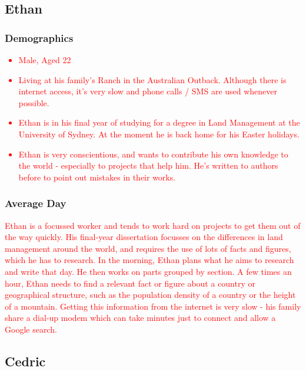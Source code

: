 \documentclass{article}
\begin{document}
\newpage
\subsection{Ethan}
\subsubsection{Demographics}
\textcolor{red}{
\begin{itemize}
  \item Male, Aged 22
  \item Living at his family's Ranch in the Australian Outback.  Although there is internet access, it's very slow and phone calls / SMS are used whenever possible.
  \item Ethan is in his final year of studying for a degree in Land Management at the University of Sydney.  At the moment he is back home for his Easter holidays.
  \item Ethan is very conscientious, and wants to contribute his own knowledge to the world - especially to projects that help him.  He's written to authors before to point out mistakes in their works.
\end{itemize}
}
\subsubsection{Average Day}
\textcolor{red}{
Ethan is a focussed worker and tends to work hard on projects to get them out of the way quickly.  His final-year dissertation focusses on the differences in land management around the world, and requires the use of lots of facts and figures, which he has to research.  In the morning, Ethan plans what he aims to research and write that day.  He then works on parts grouped by section.  A few times an hour, Ethan needs to find a relevant fact or figure about a country or geographical structure, such as the population density of a country or the height of a mountain.  Getting this information from the internet is very slow - his family share a dial-up modem which can take minutes just to connect and allow a Google search.
}

\newpage
\subsection{Cedric}
\end{document}

